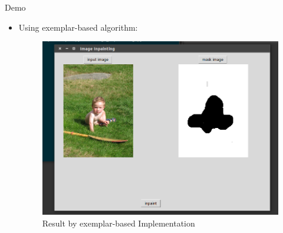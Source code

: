 \documentclass{beamer}
\begin{document}
\begin{frame}{Demo}
	\begin{itemize}
		\item Using exemplar-based algorithm:
		\begin{figure}
			\centering
			\includegraphics[width=0.8\linewidth]{eb_result.png}
			\caption{Result by exemplar-based Implementation}
		\end{figure}
	\end{itemize}
\end{frame}
\end{document}

